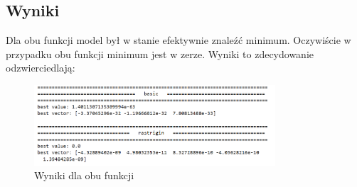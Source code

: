 \documentclass{article}
\begin{document}
\subsection*{Wyniki}
Dla obu funkcji model był w stanie efektywnie znaleźć minimum. Oczywiście w przypadku obu funkcji minimum jest w zerze. Wyniki to zdecydowanie odzwierciedlają:
\begin{figure}[H]
    \centering
    \includegraphics[width=0.8\textwidth]{img/ae1/results.png}
    \caption{Wyniki dla obu funkcji}
\end{figure}
\end{document}
